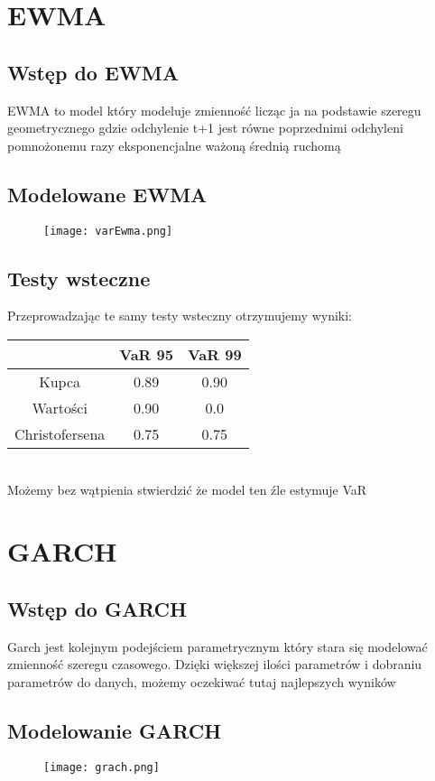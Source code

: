 \documentclass[]{article}
\begin{document}
	
\section{EWMA}
	\subsection{Wstęp do EWMA }
	EWMA to model który modeluje zmienność licząc ja na podstawie szeregu geometrycznego gdzie odchylenie t+1 jest równe poprzednimi odchyleni pomnożonemu razy eksponencjalne ważoną średnią ruchomą 
	
	\subsection{Modelowane EWMA}
	\begin{figure}[h!]
		\centering
		\texttt{[image: varEwma.png]}
		\caption{}
		\label{fig:varewma}
	\end{figure}
	
	

	\subsection{Testy wsteczne}
	Przeprowadzając te samy testy wsteczny otrzymujemy wyniki: 
	\\
	\begin{tabular}{|c|c|c|}
		\hline
		& VaR 95 & VaR 99 \\
		\hline
		Kupca & 0.89 & 0.90 \\
		\hline
		Wartości & 0.90 & 0.0 \\
		\hline
		Christofersena & 0.75 & 0.75 \\
		\hline
	\end{tabular}
	\\
	Możemy bez wątpienia stwierdzić że model ten źle estymuje VaR
	
\section{GARCH }
	\subsection{Wstęp do GARCH  }
	Garch jest kolejnym podejściem parametrycznym który stara się modelować zmienność szeregu czasowego. Dzięki większej ilości parametrów i dobraniu parametrów do danych, możemy oczekiwać tutaj najlepszych wyników 
	
	\subsection{Modelowanie GARCH }
	\begin{figure}[h!]
		\centering
		\texttt{[image: grach.png]}
		\caption{}
		\label{fig:grach}
	\end{figure}
	
\end{document}
